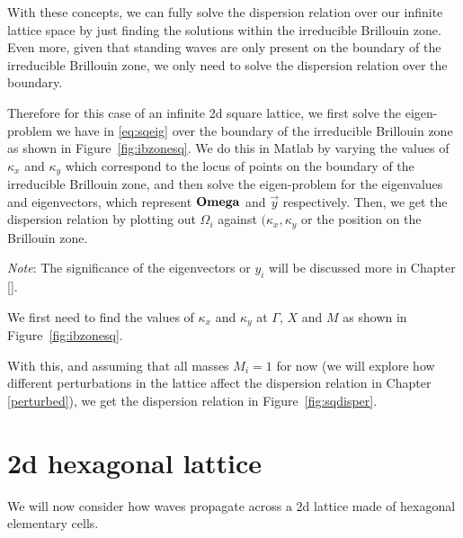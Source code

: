 With these concepts, we can fully solve the dispersion relation over our
infinite lattice space by just finding the solutions within the irreducible
Brillouin zone. Even more, given that standing waves are only present on the
boundary of the irreducible Brillouin zone, we only need to solve the
dispersion relation over the boundary.

Therefore for this case of an infinite 2d square lattice, we first solve the
eigen-problem we have in \eqref{eq:sqeig} over the boundary of the irreducible
Brillouin zone as shown in Figure~\ref{fig:ibzonesq}. We do this in Matlab by
varying the values of $\kappa_{x}$ and $\kappa_{y}$ which correspond to the
locus of points on the boundary of the irreducible Brillouin zone, and then
solve the eigen-problem for the eigenvalues and eigenvectors, which represent
$\mathbf{Omega}$ and $\vec{y}$ respectively. Then, we get the dispersion relation
by plotting out $\Omega_i$ against $(\kappa_x,\kappa_y$ or the position on the
Brillouin zone.

\textit{Note}: The significance of the eigenvectors or $y_i$ will be discussed
more in Chapter \ref{}.

We first need to find the values of $\kappa_{x}$ and $\kappa_{y}$ at $\Gamma$,
$X$ and $M$ as shown in Figure~\ref{fig:ibzonesq}.

With this, and assuming that all masses $M_i=1$ for now (we will explore how
different perturbations in the lattice affect the dispersion relation in
Chapter \ref{perturbed}), we get the dispersion relation in
Figure~\ref{fig:sqdisper}. 

\section{2d hexagonal lattice}
\label{2dhexdisper}
We will now consider how waves propagate across a 2d lattice made of hexagonal
elementary cells. 


